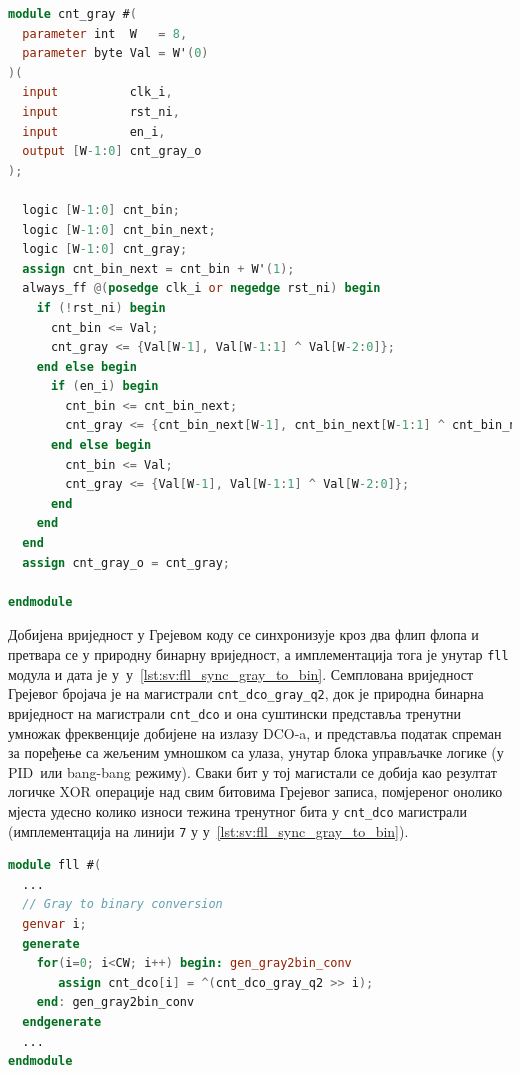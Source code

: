 \documentclass[master]{finthesis}
\newcommand*{\prog}[1]{\texttt{#1}}
\def \DCO  {DCO} %
\def \PID  {PID} %
\begin{document}
\begin{lstlisting}[language=Verilog, caption={Модул Грејевог бројача.}, label={lst:sv:cnt_gray}]
module cnt_gray #(
  parameter int  W   = 8,
  parameter byte Val = W'(0)
)(
  input          clk_i,
  input          rst_ni,
  input          en_i,
  output [W-1:0] cnt_gray_o
);

  logic [W-1:0] cnt_bin;
  logic [W-1:0] cnt_bin_next;
  logic [W-1:0] cnt_gray;
  assign cnt_bin_next = cnt_bin + W'(1);
  always_ff @(posedge clk_i or negedge rst_ni) begin
    if (!rst_ni) begin
      cnt_bin <= Val;
      cnt_gray <= {Val[W-1], Val[W-1:1] ^ Val[W-2:0]};
    end else begin
      if (en_i) begin
        cnt_bin <= cnt_bin_next;
        cnt_gray <= {cnt_bin_next[W-1], cnt_bin_next[W-1:1] ^ cnt_bin_next[W-2:0]};
      end else begin
        cnt_bin <= Val;
        cnt_gray <= {Val[W-1], Val[W-1:1] ^ Val[W-2:0]};
      end
    end
  end
  assign cnt_gray_o = cnt_gray;

endmodule
\end{lstlisting}
Добијена вриједност у Грејевом коду се синхронизује кроз два флип флопа и претвара се у природну бинарну вриједност, а имплементација тога је унутар \prog{fll} модула и дата је у~\lstlistingname{у}~\ref{lst:sv:fll_sync_gray_to_bin}. Семплована вриједност Грејевог бројача је на магистрали \prog{cnt\_dco\_gray\_q2}, док је природна бинарна вриједност на магистрали \prog{cnt\_dco} и она суштински представља тренутни умножак фреквенције добијене на излазу \DCO-a, и представља податак спреман за поређење са жељеним умношком са улаза, унутар блока управљачке логике (у \PID\ или bang-bang режиму). Сваки бит у тој магистали се добија као резултат логичке XOR операције над свим битовима Грејевог записа, помјереног онолико мјеста удесно колико износи тежина тренутног бита у \prog{cnt\_dco} магистрали (имплементација на линији \prog{7} у \lstlistingname{у}~\ref{lst:sv:fll_sync_gray_to_bin}). \par
\begin{lstlisting}[language=Verilog, caption={Претварање Грејевог кода у природну бинарну вриједност.}, label={lst:sv:fll_sync_gray_to_bin}]
module fll #(
  ...
  // Gray to binary conversion
  genvar i;
  generate
    for(i=0; i<CW; i++) begin: gen_gray2bin_conv
       assign cnt_dco[i] = ^(cnt_dco_gray_q2 >> i);
    end: gen_gray2bin_conv
  endgenerate
  ...
endmodule
\end{lstlisting}
\end{document}
